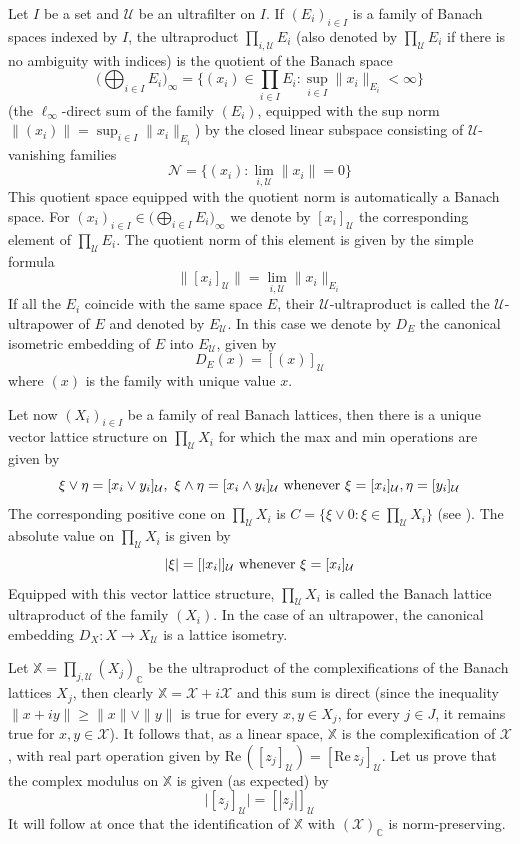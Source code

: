 \documentclass[11pt]{amsart}
\theoremstyle{plain}
\theoremstyle{remark}
\newcommand{\U}{\mathcal U}
\renewcommand{\Re}{\mathrm {Re\,}}
\begin{document}
Let $I$ be a set and $\U$ be an ultrafilter on $I$. If $(E_i)_{i\in I}$ is a family of Banach spaces indexed by $I$, the ultraproduct $\prod_{i,\U} E_i$ (also denoted by $\prod_\U E_i$ if there is no ambiguity with indices) is the quotient of the Banach space
\[\big(\bigoplus_{i\in I}E_i\big)_\infty=\big\{(x_i)\in \prod_{i\in I} E_i:\sup_{i\in I}\|x_i\|_{E_i}<\infty\big\}
\]
(the $\ell_\infty$-direct sum of the family $(E_i)$, equipped with the sup norm $\|(x_i)\|=\sup_{i\in I}\|x_i\|_{E_i}$)  by the closed linear subspace consisting of $\U$-vanishing families
\[\mathcal N= \big\{(x_i): \lim_{i,\U}\|x_i\|=0\big\} \] 
This quotient space equipped with the quotient norm is automatically a Banach space. For $(x_i)_{i\in I}\in \big(\bigoplus_{i\in I}E_i\big)_\infty$ we denote by $[x_i]_\U$ the corresponding element of $\prod_\U E_i$. The quotient norm of this element is given by the simple formula
\[ \|[x_i]_\U\|= \lim_{i,\U} \|x_i\|_{E_i}\]
If all the $E_i$ coincide with the same space $E$, their $\U$-ultraproduct is called the $\U$-ultrapower of $E$ and denoted by $E_\U$. In this case we denote by  $D_E$  the canonical isometric embedding of $E$ into $E_\U$, given by
\[D_E(x)= [(x)]_\U\]
where $(x)$ is the family with unique value $x$.

Let now $(X_i)_{i\in I}$ be a family of real Banach lattices, then  there is a unique vector lattice structure on $\prod_\U X_i$ for which the max and min operations are given by
\[ \xi\vee \eta= [x_i\vee y_i]_\U,\ \xi\wedge \eta= [x_i\wedge y_i]_\U \hbox{ whenever } \xi=[x_i]_\U, \eta=[y_i]_\U\]
The  corresponding positive cone on $\prod_\U X_i$ is  $C=\{\xi\vee 0: \xi\in  \prod_\U X_i\}$ (see \cite[proof of Proposition 3.2]{H}). The absolute value  on $\prod_\U X_i$ is given by
 \[ |\xi|=[|x_i|]_\U \hbox{ whenever } \xi=[x_i]_\U\]
Equipped with this vector lattice structure, $\prod_\U X_i$ is called the Banach lattice ultraproduct of the family $(X_i)$. In the case of an ultrapower, the canonical embedding $D_X: X\to X_\U$ is a lattice isometry.

Let $\mathbb X=\prod_{j,\U}(X_j)_\mathbb C$ be the ultraproduct of the complexifications of the Banach lattices $X_j$, then clearly $\mathbb X=\mathcal X+i\mathcal X$ and this sum is direct  (since the inequality $\|x+iy\|\ge  \|x\|\vee\|y\|$ is true for every  $x,y\in X_j$, for every $j\in J$, it remains true for $x,y\in \mathcal X$). It follows that, as a linear  space,  $\mathbb X$ is the complexification of $\mathcal X$, with real part operation given by $\Re ([z_j]_\U) = [\Re z_j]_\U$. Let us prove that the complex modulus on  $\mathbb X$ is given (as expected) by
\[ \big|[z_j]_\U\big| =[|z_j|]_\U \]
It will follow at once that the identification of $\mathbb X$ with $\left(\mathcal X\right)_\mathbb C$ is norm-preserving.
\end{document}
